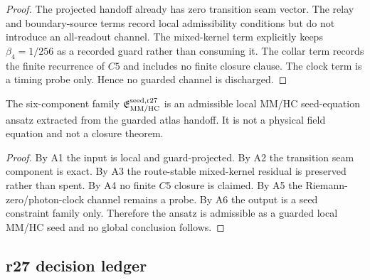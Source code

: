 \begin{proof}
The projected handoff already has zero transition seam vector.  The relay and
boundary-source terms record local admissibility conditions but do not introduce
an all-readout channel.  The mixed-kernel term explicitly keeps
\(\beta_4=1/256\) as a recorded guard rather than consuming it.  The collar term
records the finite recurrence of \(C5\) and includes no finite closure clause.
The clock term is a timing probe only.  Hence no guarded channel is discharged.
\end{proof}

\begin{theoremlet}
\label{thmlet:v470-r27-guarded-seed-equation-ansatz}
The six-component family \(\mathfrak E_{\rm MM/HC}^{\rm seed,r27}\) is an
admissible local MM/HC seed-equation ansatz extracted from the guarded atlas
handoff.  It is not a physical field equation and not a closure theorem.
\end{theoremlet}

\begin{proof}
By A1 the input is local and guard-projected.  By A2 the transition seam
component is exact.  By A3 the route-stable mixed-kernel residual is preserved
rather than spent.  By A4 no finite \(C5\) closure is claimed.  By A5 the
Riemann-zero/photon-clock channel remains a probe.  By A6 the output is a seed
constraint family only.  Therefore the ansatz is admissible as a guarded local
MM/HC seed and no global conclusion follows.
\end{proof}

\subsection{r27 decision ledger}
\label{subsec:v470-r27-decision-ledger}

